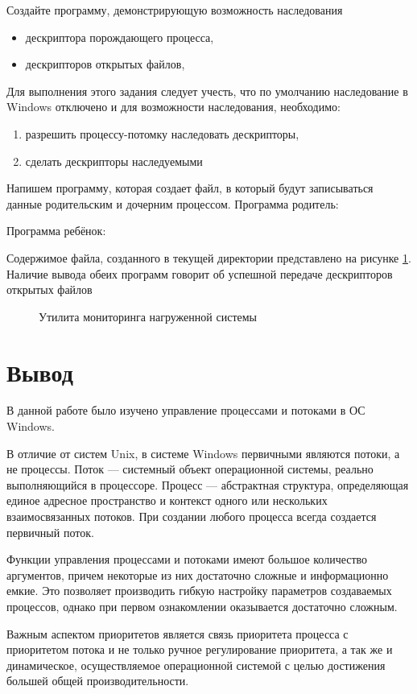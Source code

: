 \documentclass[a4paper]{article}
\begin{document}
	 Создайте программу, демонстрирующую возможность наследования
	 \begin{itemize}
\item дескриптора порождающего процесса,
\item дескрипторов открытых файлов,
	 \end{itemize}
Для выполнения этого задания следует учесть, что по умолчанию наследование в Windows отключено и для возможности наследования, необходимо:
	 \begin{enumerate}
\item  разрешить процессу-потомку наследовать дескрипторы,
\item  сделать дескрипторы наследуемыми
	\end{enumerate}
	Напишем программу, которая создает файл, в который будут записываться данные родительским и дочерним процессом.
	Программа родитель:
	
	
	Программа ребёнок:
	
	
	Содержимое файла, созданного в текущей директории представлено на рисунке \ref{img:fd}. Наличие вывода обеих программ говорит об успешной передаче дескрипторов открытых файлов
	
	\begin{figure}[h!]
		\caption{Утилита мониторинга нагруженной системы}
		\label{img:fd}
	\end{figure}

\section{Вывод}
	В данной работе было изучено управление процессами и потоками в ОС Windows.
	
	В отличие от систем Unix, в системе Windows первичными являются потоки, а не процессы. Поток --– системный объект операционной системы, реально выполняющийся в процессоре. Процесс --– абстрактная структура, определяющая единое адресное пространство и контекст одного или нескольких взаимосвязанных потоков. При создании любого процесса всегда создается первичный поток.
	
	Функции управления процессами и потоками имеют большое количество аргументов, причем некоторые из них достаточно сложные и информационно емкие. Это позволяет производить гибкую настройку параметров создаваемых процессов, однако при первом ознакомлении оказывается достаточно сложным.
	
	
	Важным аспектом приоритетов является связь приоритета процесса с приоритетом потока и не только ручное регулирование приоритета, а так же и динамическое, осуществляемое операционной системой с целью достижения большей общей производительности.
\end{document}
